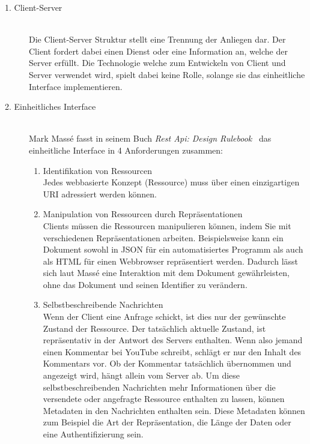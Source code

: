 \begin{description}

    \item[1. Client-Server]\hfill \\
    Die Client-Server Struktur stellt eine Trennung der Anliegen dar. Der Client
    fordert dabei einen Dienst oder eine Information an, welche der Server erfüllt.
    Die Technologie welche zum Entwickeln von Client und Server verwendet wird,
    spielt dabei keine Rolle, solange sie das einheitliche Interface implementieren.

    \item[2. Einheitliches Interface]\hfill \\
    Mark Massé fasst in seinem Buch \textit{Rest Api: Design Rulebook}~\cite{Mas11}
    das einheitliche Interface in 4 Anforderungen zusammen: 
    
    \begin{enumerate}
        \item Identifikation von Ressourcen\hfill \\
        Jedes webbasierte Konzept (Ressource) muss über einen einzigartigen 
        \gls{URI} adressiert werden können. 

        \item Manipulation von Ressourcen durch Repräsentationen\hfill \\
        Clients müssen die Ressourcen manipulieren können, indem Sie mit verschiedenen
        Repräsentationen arbeiten. Beispielsweise kann ein Dokument sowohl in 
        \gls{JSON} für ein automatisiertes Programm als auch als \gls{HTML} für 
        einen Webbrowser repräsentiert werden. Dadurch lässt sich laut Massé eine
        Interaktion mit dem Dokument gewährleisten, ohne das Dokument und seinen
        Identifier zu verändern.

        \item Selbstbeschreibende Nachrichten\hfill \\
        Wenn der Client eine Anfrage schickt, ist dies nur der gewünschte Zustand
        der Ressource. Der tatsächlich aktuelle Zustand, ist repräsentativ in 
        der Antwort des Servers enthalten. Wenn also jemand einen Kommentar bei 
        YouTube schreibt, schlägt er nur den Inhalt des Kommentars vor. Ob der 
        Kommentar tatsächlich übernommen und angezeigt wird, hängt allein vom 
        Server ab. 
        Um diese selbstbeschreibenden Nachrichten mehr Informationen über die 
        versendete oder angefragte Ressource enthalten zu lassen, können Metadaten
        in den Nachrichten enthalten sein. Diese Metadaten können zum Beispiel
        die Art der Repräsentation, die Länge der Daten oder eine Authentifizierung 
        sein.\\


\end{enumerate}
\end{description}
